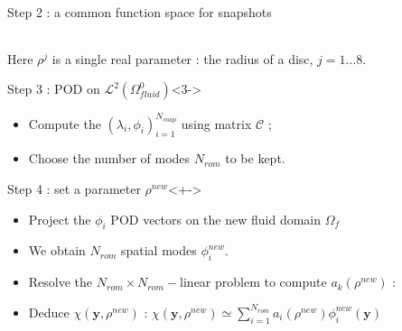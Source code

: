 \begin{frame}
\begin{block}{Step 2 : a common function space for snapshots}
{\begin{center}
\begin{tabular}{|c|c|c|c|}
\\
\hline
\end{tabular}
\end{center}
}
%
\footnotesize{Here $\rho^j$ is a single real parameter : the radius of a disc, $j=1 \dots 8$.}
\end{block}
%
\begin{block}{Step 3 : POD on $\mathcal{L}^2(\Omega_{fluid}^0)$}<3->
\begin{itemize}
\item<+-> Compute the $(\lambda_i,\phi_i)_{i=1}^{N_{snap}}$ using matrix $\mathcal{C}$ ;%
\item<+-> Choose the number of modes $N_{rom}$ to be kept.%
\end{itemize}
\end{block}
%
\end{frame}

\begin{frame}%
%
\begin{block}{Step 4 : set a parameter $\rho^{new}$}<+->
\begin{itemize}
\item<+-> Project the $\phi_i$ POD vectors on the new fluid domain $\Omega_f$
\item<+-> We obtain $N_{rom}$ spatial modes $\phi_i^{new}$.
\item<+-> Resolve the $N_{rom}\times N_{rom}-$linear problem to compute $a_k(\rho^{new})$ :
\end{itemize}
\begin{itemize}
\item<+-> Deduce $\chi(\mathbf{y},\rho^{new})$ : $\chi\left(\mathbf{y},\rho^{new}\right)\simeq \sum\limits_{i=1}^{N_{rom}} a_i \left(\rho^{new}\right)\phi_i^{new}(\mathbf{y})$
\end{itemize}

\end{block}
%
\end{frame}
